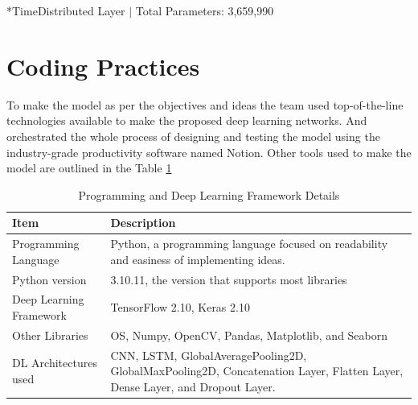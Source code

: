 \vspace{-12mm}

*TimeDistributed Layer $|$ Total Parameters: 3,659,990


\clearpage


\section{Coding Practices}

To make the model as per the objectives and ideas the team used top-of-the-line technologies available to make the proposed deep learning networks. And orchestrated the whole process of designing and testing the model using the industry-grade productivity software named Notion. Other tools used to make the model are outlined in the Table \ref{tab:programmingDetails}

\begin{table}[!htbp]
    \centering
     \caption{Programming and Deep Learning Framework Details}
    \begin{tabular}{|>{\raggedright\arraybackslash}p{4cm}|p{10cm}|}
        \hline
        \textbf{Item} & \textbf{Description} \\
        \hline
        Programming Language & Python\cite{python}, a programming language focused on readability and easiness of implementing ideas. \\
        \hline
        Python version & 3.10.11, the version that supports most libraries \\
        \hline
        Deep Learning Framework & TensorFlow 2.10\cite{tf_paper}, Keras 2.10\cite{keras} \\
        \hline
        Other Libraries & OS, Numpy, OpenCV, Pandas, Matplotlib, and Seaborn  \\
        \hline
        DL Architectures used & CNN, LSTM, GlobalAveragePooling2D, GlobalMaxPooling2D, Concatenation Layer, Flatten Layer, Dense Layer, and Dropout Layer. \\
        \hline
    \end{tabular}
    \label{tab:programmingDetails}
\end{table}


